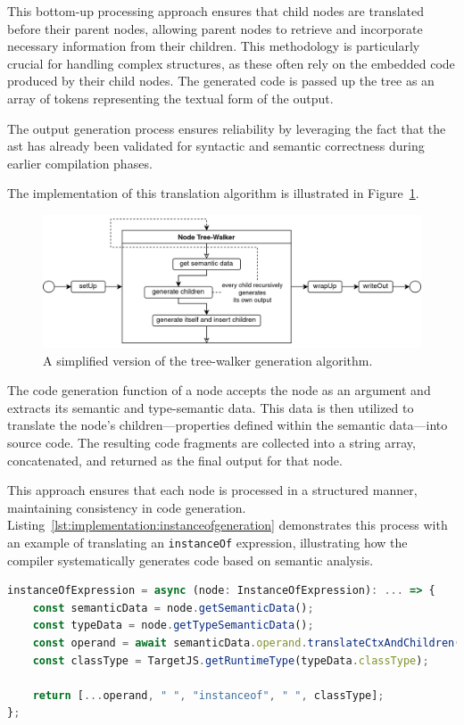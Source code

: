 This bottom-up processing approach ensures that child nodes are translated before their parent nodes, allowing parent nodes to retrieve and incorporate necessary information from their children. This methodology is particularly crucial for handling complex structures, as these often rely on the embedded code produced by their child nodes. The generated code is passed up the tree as an array of tokens representing the textual form of the output.

The output generation process ensures reliability by leveraging the fact that the \acrshort{ast} has already been validated for syntactic and semantic correctness during earlier compilation phases.

The implementation of this translation algorithm is illustrated in Figure~\ref{fig:implementation:translationalgorithm}.

\begin{figure}[h!]
	\centering
	\includegraphics[scale=0.9]{./pics/Output-Generation.drawio}
	\caption{A simplified version of the tree-walker generation algorithm.}
	\label{fig:implementation:translationalgorithm}
\end{figure}

The code generation function of a node accepts the node as an argument and extracts its semantic and type-semantic data. This data is then utilized to translate the node's children—properties defined within the semantic data—into source code. The resulting code fragments are collected into a string array, concatenated, and returned as the final output for that node.

This approach ensures that each node is processed in a structured manner, maintaining consistency in code generation. Listing~\ref{lst:implementation:instanceofgeneration} demonstrates this process with an example of translating an \lstinline|instanceOf| expression, illustrating how the compiler systematically generates code based on semantic analysis.

\begin{lstlisting}[language=TypeScript,caption=The code generation function of a \lstinline|instanceOf| expression,label=lst:implementation:instanceofgeneration]
instanceOfExpression = async (node: InstanceOfExpression): ... => {
	const semanticData = node.getSemanticData();
	const typeData = node.getTypeSemanticData();
	const operand = await semanticData.operand.translateCtxAndChildren();
	const classType = TargetJS.getRuntimeType(typeData.classType);

	return [...operand, " ", "instanceof", " ", classType];
};
\end{lstlisting}

